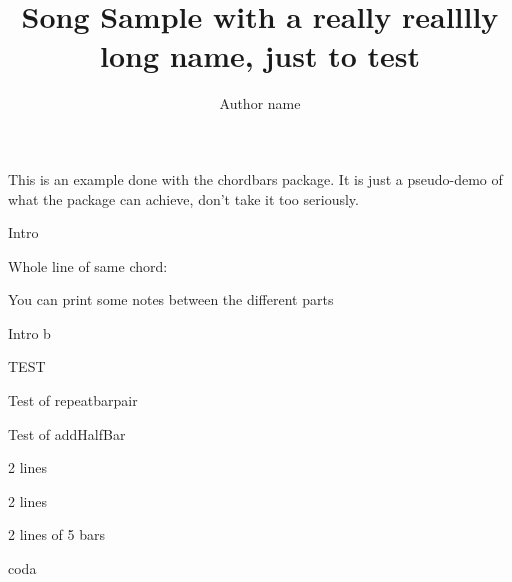 \documentclass[11pt]{article}
\title{Song Sample with a really realllly long name, just to test}
\author{Author name}
\begin{document}


\countbarsYes

\songtitle

This is an example done with the chordbars package.
It is just a pseudo-demo of what the package can achieve, don't take it too seriously.



\begin{chordbar}{4}{Intro}
\end{chordbar}


Whole line of same chord:


You can print some notes between the different parts

\def\barsize{1.8}%
\def\chordFontSize{\huge\bfseries}
\begin{chordbar}[3]{6}{Intro b}
\repeatBar
{}
\end{chordbar}


\def\barsize{1.4}%
\begin{chordbar}[2]{4}{TEST}
\repeatBar
\end{chordbar}

\def\barsize{2}
\def\chordFontSize{\Large\bfseries}
\begin{chordbar}{5}{Test of repeatbarpair}
\repeatBarPair
{}
\end{chordbar}


\begin{chordbar}{4}{Test of addHalfBar}
\repeatBar
{}
\end{chordbar}


\begin{chordbar}[2]{6}{2 lines}
\repeatBar
{}
\repeatBar
\end{chordbar}

\begin{chordbar}[4]{11}{2 lines}
\newchordline
{}
\repeatBar
\end{chordbar}

\def\NumberOfBarsPerLine{5}

\begin{chordbar}[2]{10}{2 lines of 5 bars}
\newchordline
{}
\repeatBar
\end{chordbar}


\def\NumberOfBarsPerLine{8}
\begin{chordbar}[2]{6}{coda}
\end{chordbar}


\printNbBars
\end{document}
